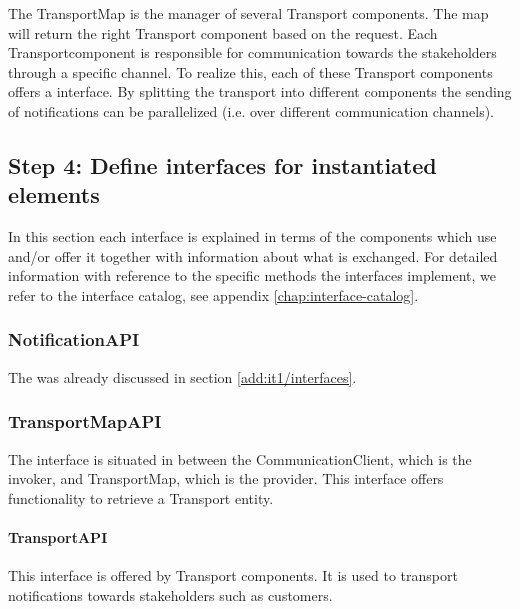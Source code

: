 \npar The TransportMap is the manager of several Transport components. The
map will return the right Transport component based on the request. Each
Transportcomponent is responsible for communication towards the stakeholders
through a specific channel. To realize this, each of these Transport components
offers a  interface. By splitting the transport into
different components the sending of notifications can be parallelized (i.e. over
different communication channels).

\subsection{Step 4: Define interfaces for instantiated elements}
\label{add:it8/interfaces}

\npar In this section each interface is explained in terms of the components
which use and/or offer it together with information about what is exchanged. For
detailed information with reference to the specific methods the interfaces
implement, we refer to the interface catalog, see appendix
\ref{chap:interface-catalog}.

\subsubsection{NotificationAPI}

\npar The  was already discussed in section
\ref{add:it1/interfaces}.

\subsubsection{TransportMapAPI}

\npar The  interface is situated in between the
CommunicationClient, which is the invoker, and TransportMap, which is the
provider. This interface offers functionality to retrieve a Transport entity.

\paragraph{TransportAPI}

\npar This interface is offered by Transport components. It is used to transport
notifications towards stakeholders such as customers.

